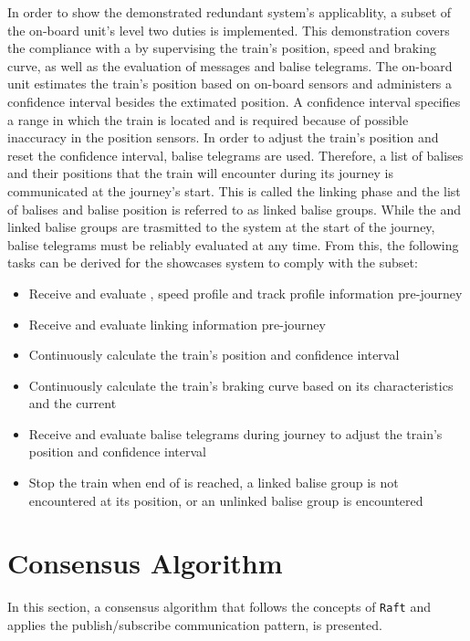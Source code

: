 In order to show the demonstrated redundant system's applicablity, a subset of the on-board unit's  level two duties is implemented.
This demonstration covers the compliance with a  by supervising the train's position, speed and braking curve, as well as the evaluation of  messages and balise telegrams.
The on-board unit estimates the train's position based on on-board sensors and administers a confidence interval besides the extimated position.
A confidence interval specifies a range in which the train is located and is required because of possible inaccuracy in the position sensors.
In order to adjust the train's position and reset the confidence interval, balise telegrams are used.
Therefore, a list of balises and their positions that the train will encounter during its journey is communicated at the journey's start.
This is called the linking phase and the list of balises and balise position is referred to as linked balise groups.
While the  and linked balise groups are trasmitted to the system at the start of the journey, balise telegrams must be reliably evaluated at any time.
From this, the following tasks can be derived for the showcases system to comply with the  subset:

\begin{itemize}
\item Receive and evaluate , speed profile and track profile information pre-journey
\item Receive and evaluate linking information pre-journey
\item Continuously calculate the train's position and confidence interval
\item Continuously calculate the train's braking curve based on its characteristics and the current 
\item Receive and evaluate balise telegrams during journey to adjust the train's position and confidence interval
\item Stop the train when end of  is reached, a linked balise group is not encountered at its position, or an unlinked balise group is encountered
\end{itemize}


\section{Consensus Algorithm}
\label{sec:ImpConsensusAlgorithm}

In this section, a consensus algorithm that follows the concepts of \texttt{Raft} and applies the  publish/subscribe communication pattern, is presented.

